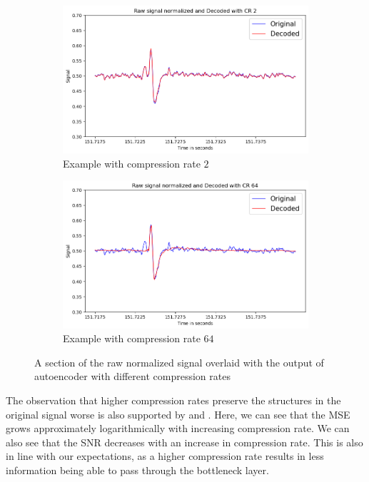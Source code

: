 \begin{figure}[h]
	\centering
	\begin{subfigure}[b]{.49\textwidth}
		\centering
		\includegraphics[width=\textwidth]{../../Images/Presentation_Segment_CR2.png}
		\caption{Example with compression rate $2$}
		\label{fig:CR2AndCR641}
	\end{subfigure}
\hfill
	\begin{subfigure}[b]{.49\textwidth}
		\centering
		\includegraphics[width=\textwidth]{../../Images/Presentation_Segment_CR64.png}
		\caption{Example with compression rate $64$}
		\label{fig:CR2AndCR642}
	\end{subfigure}
	\caption{A section of the raw normalized signal overlaid with the output of autoencoder with different compression rates}
	\label{fig:CR2AndCR64}
\end{figure}
\FloatBarrier

The observation that higher compression rates preserve the structures in the original signal worse is also supported by  and .
Here, we can see that the MSE grows approximately logarithmically with increasing compression rate.
We can also see that the SNR decreases with an increase in compression rate.
This is also in line with our expectations, as a higher compression rate results in less information being able to pass through the bottleneck layer.


